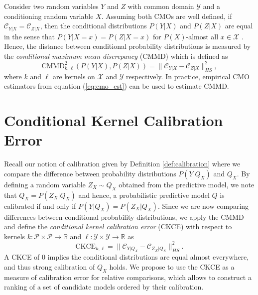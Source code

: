 \documentclass[twocolumn]{article}
\theoremstyle{definition}
\begin{document}
Consider two random variables $Y$ and $Z$ with common domain $\mathcal{Y}$ and a conditioning random variable $X$. Assuming both CMOs are well defined, if $\mathcal{C}_{Y | X} = \mathcal{C}_{Z | X}$, then the conditional distributions $P(Y|X)$ and $P(Z|X)$ are equal in the sense that $P(Y|X=x) = P(Z|X=x)$ for $P(X)$-almost all $x \in \mathcal{X}$ \citep[Theorem 3]{Ren_2016}. Hence, the distance between conditional probability distributions is measured by the \emph{conditional maximum mean discrepancy} (CMMD) \citep{Ren_2016} which is defined as
\begin{equation*}
    \text{CMMD}_{k, \ell}^2 (P(Y|X), P(Z|X)) = \| \mathcal{C}_{Y | X} - \mathcal{C}_{Z | X}\|_{HS}^2,
\end{equation*}
where $k$ and $\ell$ are kernels on $\mathcal{X}$ and $\mathcal{Y}$ respectively. In practice, empirical CMO estimators from equation (\ref{eq:cmo_est}) can be used to estimate CMMD.  



\section{Conditional Kernel Calibration Error} \label{sec:ckce}

Recall our notion of calibration given by Definition \ref{def:calibration} where we compare the difference between probability distributions $P(Y|Q_X)$ and $Q_X$. By defining a random variable $Z_X \sim Q_X$ obtained from the predictive model, we note that $Q_X = P(Z_X | Q_X)$ and hence, a probabilistic predictive model $Q$ is calibrated if and only if $P(Y|Q_X) = P(Z_X|Q_X)$. Since we are now comparing differences between conditional probability distributions, we apply the CMMD and define the \emph{conditional kernel calibration error} (CKCE) with respect to kernels $k: \mathcal{P} \times \mathcal{P} \to \mathbb{R}$ and $\ell: \mathcal{Y} \times \mathcal{Y} \to \mathbb{R}$ as
\begin{equation}
    \text{CKCE}_{k, \ell} = \| \mathcal{C}_{Y | Q_X} - \mathcal{C}_{Z_X | Q_X} \|_{HS}^2.
\end{equation}
A CKCE of 0 implies the conditional distributions are equal almost everywhere, and thus strong calibration of $Q_X$ holds. We propose to use the CKCE as a measure of calibration error for relative comparisons, which allows to construct a ranking of a set of candidate models ordered by their calibration. 

\end{document}
